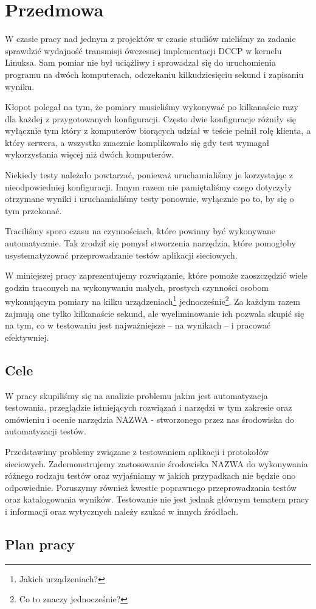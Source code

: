 \documentclass[00-praca-magisterska.tex]{subfiles}
\begin{document}
\chapter{Przedmowa}

W czasie pracy nad jednym z projektów w czasie studiów mieliśmy za zadanie
sprawdzić wydajność transmisji ówczesnej implementacji DCCP w kernelu Linuksa.
Sam pomiar nie był uciążliwy i sprowadzał się do uruchomienia programu na dwóch
komputerach, odczekaniu kilkudziesięciu sekund i zapisaniu wyniku.

Kłopot polegał na tym, że pomiary musieliśmy wykonywać po kilkanaście razy dla
każdej z przygotowanych konfiguracji. Często dwie konfiguracje różniły się
wyłącznie tym który z komputerów biorących udział w teście pełnił rolę klienta,
a który serwera, a wszystko znacznie komplikowało się gdy test wymagał
wykorzystania więcej niż dwóch komputerów.

Niekiedy testy należało powtarzać, ponieważ uruchamialiśmy je korzystając z
nieodpowiedniej konfiguracji. Innym razem nie pamiętaliśmy czego dotyczyły
otrzymane wyniki i uruchamialiśmy testy ponownie, wyłącznie po to, by się o tym
przekonać.

Traciliśmy sporo czasu na czynnościach, które powinny być wykonywane
automatycznie. Tak zrodził się pomysł stworzenia narzędzia, które
pomogłoby usystematyzować przeprowadzanie testów aplikacji sieciowych.

W miniejszej pracy zaprezentujemy rozwiązanie, które pomoże zaoszczędzić wiele
godzin traconych na wykonywaniu małych, prostych czynności osobom wykonującym
pomiary na kilku urządzeniach\footnote{Jakich urządzeniach?}
jednocześnie\footnote{Co to znaczy jednocześnie?}. Za każdym razem zajmują one
tylko kilkanaście sekund, ale wyeliminowanie ich pozwala skupić się na tym, co w
testowaniu jest najważniejsze -- na wynikach -- i pracować efektywniej.

\section{Cele}

W pracy skupiliśmy się na analizie problemu jakim jest automatyzacja testowania,
przeglądzie istniejących rozwiązań i narzędzi w tym zakresie oraz omówieniu i
ocenie narzędzia NAZWA - stworzonego przez nas środowiska do automatyzacji
testów. 

Przedstawimy problemy związane z testowaniem aplikacji i protokołów sieciowych.
Zademonstrujemy zastosowanie środowiska NAZWA do wykonywania różnego rodzaju
testów oraz wyjaśniamy w jakich przypadkach nie będzie ono odpowiednie.
Poruszymy również kwestie poprawnego przeprowadzania testów oraz katalogowania
wyników. Testowanie nie jest jednak głównym tematem pracy i informacji oraz
wytycznych należy szukać w innych źródłach.


\section{Plan pracy}

\end{document}
